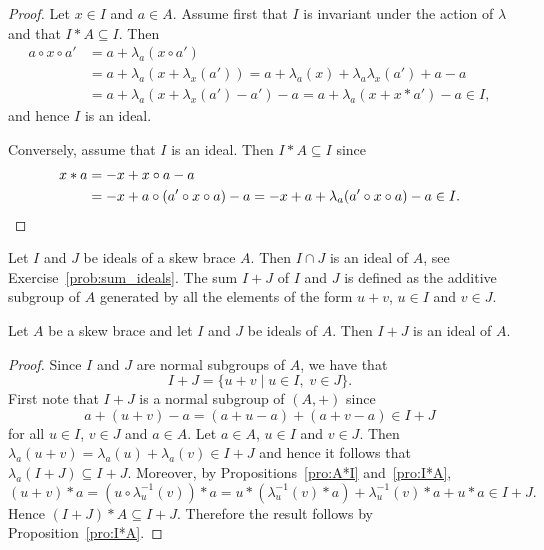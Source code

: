 \begin{proof}
    Let $x\in I$ and $a\in A$.  Assume first that $I$ is invariant under the
    action of $\lambda$ and that $I*A\subseteq I$. Then
    \begin{equation}
    \label{eq:trick:I*A}
        \begin{aligned}
        a\circ x\circ a' &=a+\lambda_a(x\circ a')\\
        &=a+\lambda_a(x+\lambda_x(a'))
        =a+\lambda_a(x)+\lambda_a\lambda_x(a')+a-a\\
        &=a+\lambda_a(x+\lambda_x(a')-a')-a
        =a+\lambda_a(x+x*a')-a\in I,
    \end{aligned}
    \end{equation}
    and hence $I$ is an ideal.

    Conversely, assume that $I$ is an ideal. Then $I*A\subseteq I$ since
    \begin{align*}
        x*a&=-x+x\circ a-a\\
        &=-x+a\circ(a'\circ x\circ a)-a
        =-x+a+\lambda_a(a'\circ x\circ a)-a\in I.\qedhere
    \end{align*}
\end{proof}


Let $I$ and $J$ be ideals
of a skew brace $A$. Then $I\cap J$ is an ideal of $A$, see Exercise~\ref{prob:sum_ideals}.  
The sum $I+J$ of $I$ and $J$ is defined as the
additive subgroup of $A$ generated by all the 
elements of the form
$u+v$, $u\in I$ and $v\in J$. 

\begin{proposition}
Let $A$ be a skew brace and let
$I$ and $J$ be ideals of $A$. Then $I+J$ is an ideal of $A$.
\end{proposition}

\begin{proof}
    Since $I$ and $J$ are normal subgroups of $A$, we have that
    \[ I+J=\{ u+v \mid u\in I,\; v\in J \}.\]
    First note that $I+J$ is a normal subgroup of $(A,+)$ since
    \[
        a+(u+v)-a=(a+u-a)+(a+v-a)\in I+J
    \]
    for all $u\in I$, $v\in J$ and $a\in A$.
    Let $a\in A$, $u\in I$ and $v\in J$. Then $\lambda_a(u+v)=\lambda_a(u)+\lambda_a(v)\in I+J$ and
    hence it follows that $\lambda_a(I+J)\subseteq I+J$. Moreover, by Propositions~\ref{pro:A*I} and~\ref{pro:I*A},
        \[
        (u+v)*a=(u\circ\lambda^{-1}_u(v))*a
        =u*(\lambda^{-1}_u(v)*a)+\lambda^{-1}_u(v)*a+u*a\in I+J.
    \]
    Hence $(I+J)*A\subseteq I+J$. Therefore the result follows by Proposition~\ref{pro:I*A}.
\end{proof}


